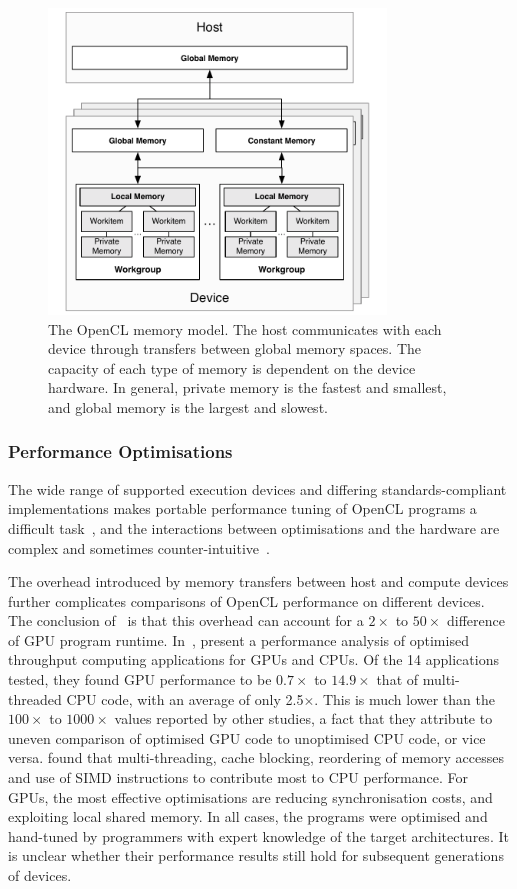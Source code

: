 \begin{figure}
	\centering
	\includegraphics[width=0.8\textwidth]{img/opencl-memory}
	\caption[The OpenCL memory model]{%
		The OpenCL memory model. The host communicates with each device through transfers between global memory spaces. The capacity of each type of memory is dependent on the device hardware. In general, private memory is the fastest and smallest, and global memory is the largest and slowest.%
	}
	\label{fig:opencl-memory}
\end{figure}

\subsubsection{Performance Optimisations}

The wide range of supported execution devices and differing standards-compliant implementations makes portable performance tuning of OpenCL programs a difficult task~\cite{Rul2010}, and the interactions between optimisations and the hardware are complex and sometimes counter-intuitive~\cite{Ryoo2008}.

The overhead introduced by memory transfers between host and compute devices further complicates comparisons of OpenCL performance on different devices. The conclusion of~\cite{Gregg2011} is that this overhead can account for a $2\times$ to $50\times$ difference of GPU program runtime. In~\cite{Lee2010}, \citeauthor{Lee2010} present a performance analysis of optimised throughput computing applications for GPUs and CPUs. Of the 14 applications tested, they found GPU performance to be $0.7\times$ to $14.9\times$ that of multi-threaded CPU code, with an average of only 2.5$\times$. This is much lower than the $100\times$ to $1000\times$ values reported by other studies, a fact that they attribute to uneven comparison of optimised GPU code to unoptimised CPU code, or vice versa. \citeauthor{Lee2010} found that multi-threading, cache blocking, reordering of memory accesses and use of SIMD instructions to contribute most to CPU performance. For GPUs, the most effective optimisations are reducing synchronisation costs, and exploiting local shared memory. In all cases, the programs were optimised and hand-tuned by programmers with expert knowledge of the target architectures. It is unclear whether their performance results still hold for subsequent generations of devices.

